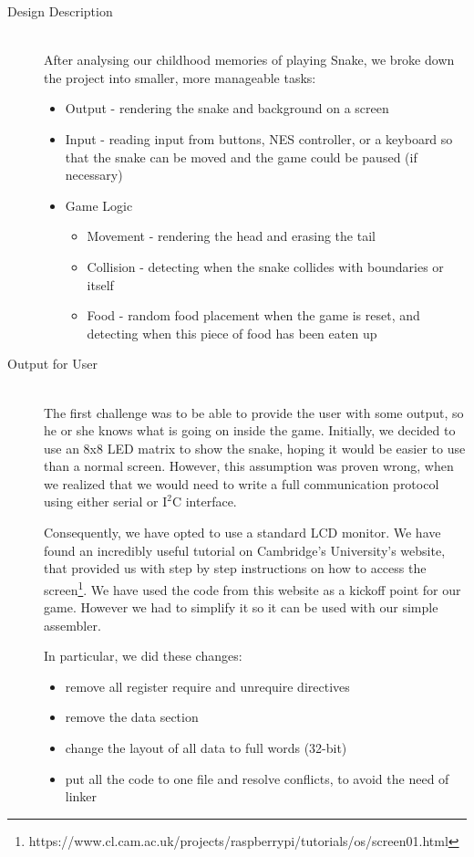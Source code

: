 \documentclass[9pt]{article}
\begin{document}
\begin{description}
    \item[Design Description] \hfill \\
    After analysing our childhood memories of playing Snake, we broke down the project into smaller, more manageable tasks:
    \begin{itemize}
    \item Output - rendering the snake and background on a screen
    \item Input - reading input from buttons, NES controller, or a keyboard so that the snake can be moved and the game could be paused (if necessary)
    \item Game Logic
        \begin{itemize}
        \item Movement - rendering the head and erasing the tail
        \item Collision - detecting when the snake collides with boundaries or itself
        \item Food - random food placement when the game is reset, and detecting when this piece of food has been eaten up
        \end{itemize}
    \end{itemize}

    \pagebreak
    \item[Output for User] \hfill \\
    The first challenge was to be able to provide the user with some output, so he or she knows what is going on inside the game. Initially, we decided to use an 8x8 LED matrix to show the snake, hoping it would be easier to use than a normal screen. However, this assumption was proven wrong, when we realized that we would need to write a full communication protocol using either serial or $\textrm{I}^{2}\textrm{C}$ interface.
    
    Consequently, we have opted to use a standard LCD monitor. We have found an incredibly useful tutorial on Cambridge's University's website, that provided us with step by step instructions on how to access the screen\footnote{https://www.cl.cam.ac.uk/projects/raspberrypi/tutorials/os/screen01.html}. We have used the code from this website as a kickoff point for our game. However we had to simplify it so it can be used with our simple assembler. 
    
    In particular, we did these changes:
    \begin{itemize}
    \item remove all register require and unrequire directives
    \item remove the data section
    \item change the layout of all data to full words (32-bit)
    \item put all the code to one file and resolve conflicts, to avoid the need of linker
    \end{itemize}
    

\end{description}
\end{document}
